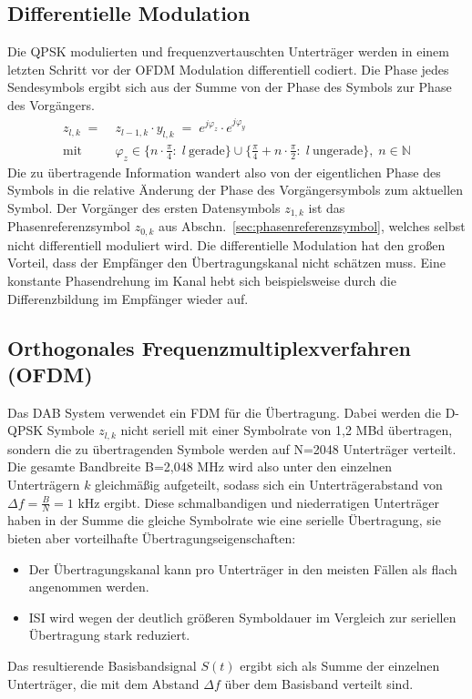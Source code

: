 \subsection{Differentielle Modulation}
\label{sec:diff_mod}
Die QPSK modulierten und frequenzvertauschten Unterträger werden in einem letzten Schritt vor der OFDM Modulation differentiell codiert. Die Phase jedes Sendesymbols ergibt sich aus der Summe von der Phase des Symbols zur Phase des Vorgängers.
\begin{equation}
\begin{aligned}
z_{l,k}\; =\; &z_{l-1,k}\cdot y_{l,k}\; =\; e^{j\varphi_z} \cdot e^{j\varphi_y} \\
\text{mit} \quad &\varphi_z \in \{n \cdot \frac{\pi}{4}: \; l \: \text{gerade}\} \cup \{\frac{\pi}{4} + n \cdot \frac{\pi}{2}: \; l \: \text{ungerade}\}, \; n\in \mathbb{N} 
\end{aligned}
\end{equation}
Die zu übertragende Information wandert also von der eigentlichen Phase des Symbols in die relative Änderung der Phase des Vorgängersymbols zum aktuellen Symbol. Der Vorgänger des ersten Datensymbols $z_{1,k}$ ist das Phasenreferenzsymbol $z_{0,k}$ aus Abschn.~\ref{sec:phasenreferenzsymbol}, welches selbst nicht differentiell moduliert wird. Die differentielle Modulation hat den großen Vorteil, dass der Empfänger den Übertragungskanal nicht schätzen muss. Eine konstante Phasendrehung im Kanal hebt sich beispielsweise durch die Differenzbildung im Empfänger wieder auf.

\subsection{Orthogonales Frequenzmultiplexverfahren (OFDM)}
\label{sec:ofdm}
Das DAB System verwendet ein \ac{FDM} für die Übertragung. Dabei werden die D-QPSK Symbole $z_{l,k}$ nicht seriell mit einer Symbolrate von 1,2 MBd übertragen, sondern die zu übertragenden Symbole werden auf N=2048 Unterträger verteilt. Die gesamte Bandbreite B=2,048 MHz wird also unter den einzelnen Unterträgern $k$ gleichmäßig aufgeteilt, sodass sich ein Unterträgerabstand von $\Delta f = \frac{B}{N} = 1$ kHz ergibt. Diese schmalbandigen und niederratigen Unterträger haben in der Summe die gleiche Symbolrate wie eine serielle Übertragung, sie bieten aber vorteilhafte Übertragungseigenschaften:
\begin{itemize}
\item Der Übertragungskanal kann pro Unterträger in den meisten Fällen als flach angenommen werden.
\item \ac{ISI} wird wegen der deutlich größeren Symboldauer im Vergleich zur seriellen Übertragung stark reduziert.
\end{itemize}
Das resultierende Basisbandsignal $S(t)$ ergibt sich als Summe der einzelnen Unterträger, die mit dem Abstand $\Delta f$ über dem Basisband verteilt sind.

